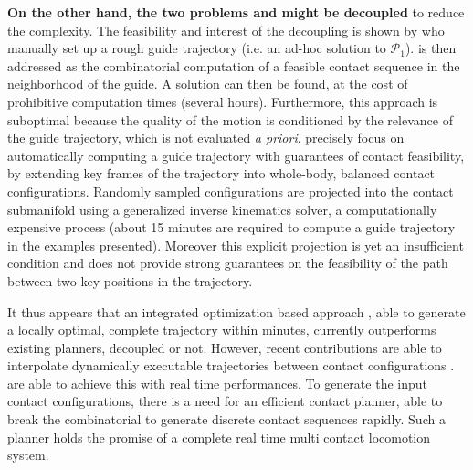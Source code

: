\textbf{On the other hand, the two problems \Pa and \Pb might be decoupled} to reduce the complexity. The feasibility and interest of the decoupling is shown by \citeauthor{DBLP:conf/iser/EscandeKMG08} who manually set up a rough guide trajectory (i.e. an ad-hoc solution to $\mathcal{P}_1$). \Pb  is then addressed as the combinatorial computation of a feasible contact sequence in the neighborhood of the guide. A solution can then be found, at the cost of prohibitive computation times (several hours). Furthermore, this approach is suboptimal because the quality of the motion is conditioned by the relevance of the guide trajectory,  which is not evaluated \textit{a priori}. \citeauthor{Bouyarmane2009} precisely focus on automatically computing a guide trajectory with guarantees of contact feasibility, by extending key frames of the trajectory into whole-body, balanced contact configurations. Randomly sampled configurations are projected into the contact submanifold using a generalized inverse kinematics solver, a computationally expensive process (about 15 minutes are required to compute a guide trajectory in the examples presented). Moreover this explicit projection is yet an insufficient condition and does not provide strong guarantees on the feasibility of the path between two key positions in the trajectory.

It thus appears that an integrated optimization based approach \citep{Mordatch:2012:DCB:2185520.2185539}, able to generate a locally optimal, complete trajectory within minutes, currently outperforms
existing planners, decoupled or not. However, recent contributions are able to interpolate dynamically executable 
trajectories between contact configurations \citep{herzog2015trajectory, Carpentier2016}. \citeauthor{Carpentier2016} are able to achieve this with real time performances.
To generate the input contact configurations, there is a need for an efficient contact planner, able to break the combinatorial to generate discrete contact sequences rapidly. 
Such a planner holds the promise of a complete real time multi contact locomotion system.

